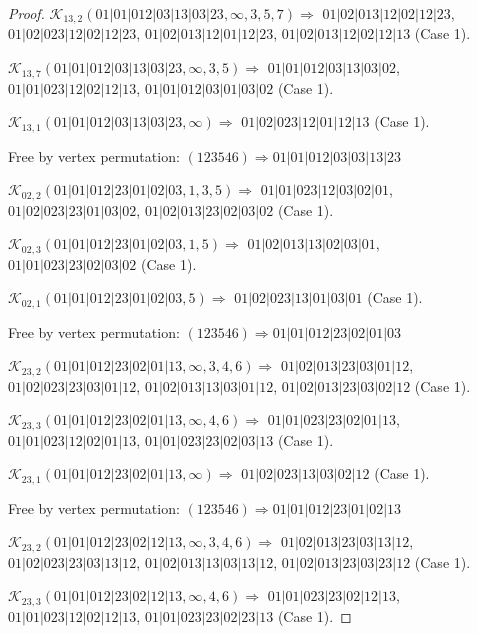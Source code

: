 \documentclass[12pt]{article}
\theoremstyle{plain}
\theoremstyle{definition}
\theoremstyle{remark}
\newcommand{\fancy}[1]{\mathcal{#1}}
\def\K{\fancy{K}}
\begin{document}
\begin{proof}
	$\K_{13,2}(01|01|012|03|13|03|23,\infty,3, 5, 7)\Rightarrow $ $01|02|013|12|02|12|23$, $01|02|023|12|02|12|23$, $01|02|013|12|01|12|23$, $01|02|013|12|02|12|13$ (Case 1).
	
	$\K_{13,7}(01|01|012|03|13|03|23,\infty,3, 5)\Rightarrow $ $01|01|012|03|13|03|02$, $01|01|023|12|02|12|13$, $01|01|012|03|01|03|02$ (Case 1).
	
	$\K_{13,1}(01|01|012|03|13|03|23,\infty)\Rightarrow $ $01|02|023|12|01|12|13$ (Case 1).
	
	
	
	Free by vertex permutation: $(1 2 3 5 4 6)\Rightarrow 01|01|012|03|03|13|23$
	
	
	
	\bigskip
	
	$\K_{02,2}(01|01|012|23|01|02|03,1, 3, 5)\Rightarrow $ $01|01|023|12|03|02|01$, $01|02|023|23|01|03|02$, $01|02|013|23|02|03|02$ (Case 1).
	
	$\K_{02,3}(01|01|012|23|01|02|03,1, 5)\Rightarrow $ $01|02|013|13|02|03|01$, $01|01|023|23|02|03|02$ (Case 1).
	
	$\K_{02,1}(01|01|012|23|01|02|03,5)\Rightarrow $ $01|02|023|13|01|03|01$ (Case 1).
	
	
	
	Free by vertex permutation: $(1 2 3 5 4 6)\Rightarrow 01|01|012|23|02|01|03$
	
	
	
	\bigskip
	
	$\K_{23,2}(01|01|012|23|02|01|13,\infty,3, 4, 6)\Rightarrow $ $01|02|013|23|03|01|12$, $01|02|023|23|03|01|12$, $01|02|013|13|03|01|12$, $01|02|013|23|03|02|12$ (Case 1).
	
	$\K_{23,3}(01|01|012|23|02|01|13,\infty,4, 6)\Rightarrow $ $01|01|023|23|02|01|13$, $01|01|023|12|02|01|13$, $01|01|023|23|02|03|13$ (Case 1).
	
	$\K_{23,1}(01|01|012|23|02|01|13,\infty)\Rightarrow $ $01|02|023|13|03|02|12$ (Case 1).
	
	
	
	Free by vertex permutation: $(1 2 3 5 4 6)\Rightarrow 01|01|012|23|01|02|13$
	
	
	
	\bigskip
	
	$\K_{23,2}(01|01|012|23|02|12|13,\infty,3, 4, 6)\Rightarrow $ $01|02|013|23|03|13|12$, $01|02|023|23|03|13|12$, $01|02|013|13|03|13|12$, $01|02|013|23|03|23|12$ (Case 1).
	
	$\K_{23,3}(01|01|012|23|02|12|13,\infty,4, 6)\Rightarrow $ $01|01|023|23|02|12|13$, $01|01|023|12|02|12|13$, $01|01|023|23|02|23|13$ (Case 1).
	

\end{proof}
\end{document}
